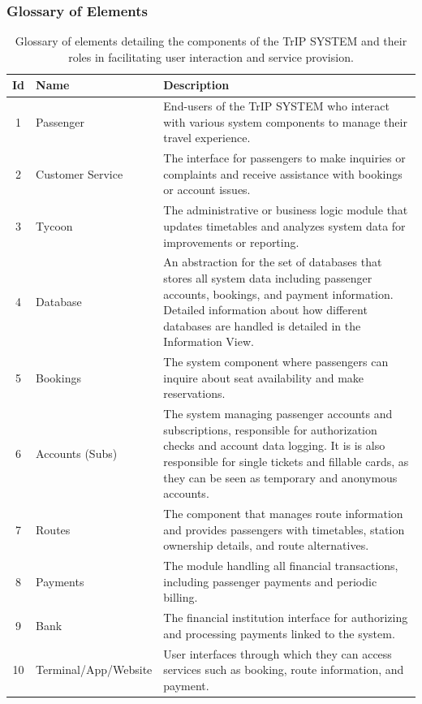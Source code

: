 \subsubsection{Glossary of Elements}
\begin{table}[H]
    \centering
    \begin{tabular}{@{}clp{9cm}@{}}
    \toprule
    \textbf{Id} & \textbf{Name} & \textbf{Description} \\
    \midrule
    1 & Passenger & End-users of the TrIP SYSTEM who interact with various system components to manage their travel experience. \\
    2 & Customer Service & The interface for passengers to make inquiries or complaints and receive assistance with bookings or account issues. \\
    3 & Tycoon & The administrative or business logic module that updates timetables and analyzes system data for improvements or reporting. \\
    4 & Database & An abstraction for the set of databases that stores all system data including passenger accounts, bookings, and payment information. Detailed information about how different databases are handled is detailed in the Information View.\\
    5 & Bookings & The system component where passengers can inquire about seat availability and make reservations. \\
    6 & Accounts (Subs) & The system managing passenger accounts and subscriptions, responsible for authorization checks and account data logging. 
    It is is also responsible for single tickets and fillable cards, as they can be seen as temporary and anonymous accounts. \\
    7 & Routes & The component that manages route information and provides passengers with timetables, station ownership details, and route alternatives. \\
    8 & Payments & The module handling all financial transactions, including passenger payments and periodic billing. \\
    9 & Bank & The financial institution interface for authorizing and processing payments linked to the system. \\
    10 & Terminal/App/Website & User interfaces through which they can access services such as booking, route information, and payment. \\
    \bottomrule
    \end{tabular}
    \caption{Glossary of elements detailing the components of the TrIP SYSTEM and their roles in facilitating user interaction and service provision.}
    \label{tab:glossary_trip_system}
\end{table}

